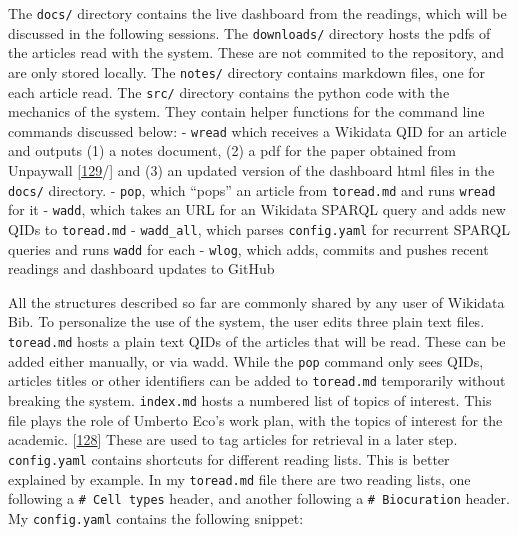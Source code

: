 The \texttt{docs/} directory contains the live dashboard from the readings, which will be discussed in the following sessions.
The \texttt{downloads/} directory hosts the pdfs of the articles read with the system.
These are not commited to the repository, and are only stored locally.
The \texttt{notes/} directory contains markdown files, one for each article read.
The \texttt{src/} directory contains the python code with the mechanics of the system.
They contain helper functions for the command line commands discussed below:
- \texttt{wread} which receives a Wikidata QID for an article and outputs (1) a notes document, (2) a pdf for the paper obtained from Unpaywall {[}\protect\hyperlink{ref-15luL9zZC}{129}/{]} and (3) an updated version of the dashboard html files in the \texttt{docs/} directory.
- \texttt{pop}, which ``pops'' an article from \texttt{toread.md} and runs \texttt{wread} for it
- \texttt{wadd}, which takes an URL for an Wikidata SPARQL query and adds new QIDs to \texttt{toread.md}
- \texttt{wadd\_all}, which parses \texttt{config.yaml} for recurrent SPARQL queries and runs \texttt{wadd} for each
- \texttt{wlog}, which adds, commits and pushes recent readings and dashboard updates to GitHub

All the structures described so far are commonly shared by any user of Wikidata Bib.
To personalize the use of the system, the user edits three plain text files.
\texttt{toread.md} hosts a plain text QIDs of the articles that will be read.
These can be added either manually, or via wadd.
While the \texttt{pop} command only sees QIDs, articles titles or other identifiers can be added to \texttt{toread.md} temporarily without breaking the system.
\texttt{index.md} hosts a numbered list of topics of interest.
This file plays the role of Umberto Eco's work plan, with the topics of interest for the academic. {[}\protect\hyperlink{ref-1HBVPtZGp}{128}{]}
These are used to tag articles for retrieval in a later step.
\texttt{config.yaml} contains shortcuts for different reading lists.
This is better explained by example.
In my \texttt{toread.md} file there are two reading lists, one following a \texttt{\#\ Cell\ types} header, and another following a \texttt{\#\ Biocuration} header.
My \texttt{config.yaml} contains the following snippet:

\begin{Shaded}
\begin{Highlighting}[]
\KeywordTok{:}
\AttributeTok{  }\KeywordTok{:}
\AttributeTok{  }\KeywordTok{:}
\end{Highlighting}
\end{Shaded}


